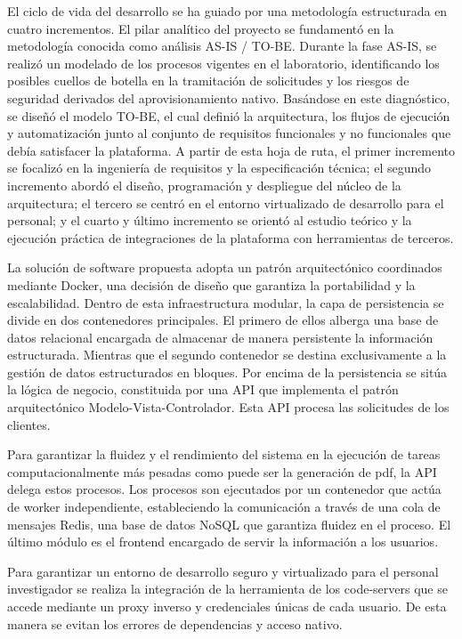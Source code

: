 El ciclo de vida del desarrollo se ha guiado por una metodología estructurada en cuatro incrementos. El pilar analítico del proyecto se fundamentó en la metodología conocida como análisis AS-IS / TO-BE. Durante la fase AS-IS, se realizó un modelado de los procesos vigentes en el laboratorio, identificando los posibles cuellos de botella en la tramitación de solicitudes y los riesgos de seguridad derivados del aprovisionamiento nativo. Basándose en este diagnóstico, se diseñó el modelo TO-BE, el cual definió la arquitectura, los flujos de ejecución y automatización junto al conjunto de requisitos funcionales y no funcionales que debía satisfacer la plataforma. A partir de esta hoja de ruta, el primer incremento se focalizó en la ingeniería de requisitos y la especificación técnica; el segundo incremento abordó el diseño, programación y despliegue del núcleo de la arquitectura; el tercero se centró en el entorno virtualizado de desarrollo para el personal; y el cuarto y último incremento se orientó al estudio teórico y la ejecución práctica de integraciones de la plataforma con herramientas de terceros. 

La solución de software propuesta adopta un patrón arquitectónico coordinados mediante Docker, una decisión de diseño que garantiza la portabilidad y la escalabilidad. Dentro de esta infraestructura modular, la capa de persistencia se divide en dos contenedores principales. El primero de ellos alberga una base de datos relacional encargada de almacenar de manera persistente la información estructurada. Mientras que el segundo contenedor se destina exclusivamente a la gestión de datos estructurados en bloques. Por encima de la persistencia se sitúa la lógica de negocio, constituida por una API que implementa el patrón arquitectónico Modelo-Vista-Controlador. Esta API procesa las solicitudes de los clientes.

Para garantizar la fluidez y el rendimiento del sistema en la ejecución de tareas computacionalmente más pesadas como puede ser la generación de pdf, la API delega estos procesos. Los procesos son ejecutados por un contenedor que actúa de worker independiente, estableciendo la comunicación a través de una cola de mensajes Redis, una base de datos NoSQL que garantiza fluidez en el proceso. El último módulo es el frontend encargado de servir la información a los usuarios.

Para garantizar un entorno de desarrollo seguro y virtualizado para el personal investigador se realiza la integración de la herramienta de los code-servers que se accede mediante un proxy inverso y credenciales únicas de cada usuario. De esta manera se evitan los errores de dependencias y acceso nativo. 


